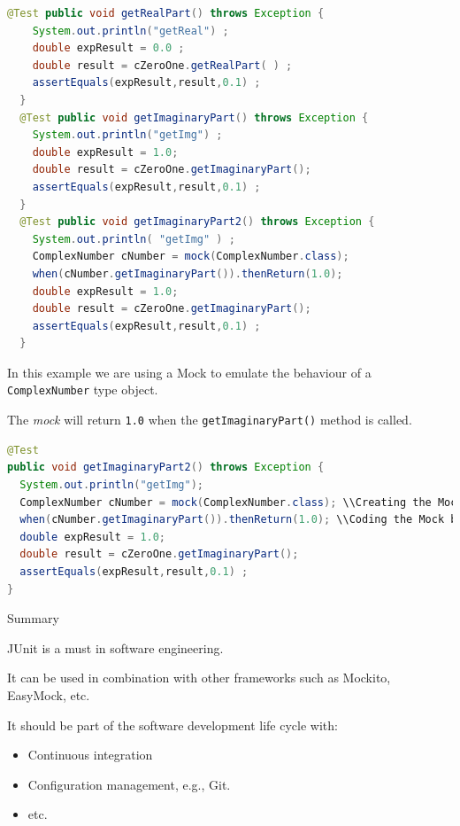 \documentclass[11pt, xcolor=svgnames]{beamer}
\begin{document}
\begin{frame}[fragile]

\begin{lstlisting}[language=JAVA,basicstyle=\scriptsize]
  @Test public void getRealPart() throws Exception {
    System.out.println("getReal") ;
    double expResult = 0.0 ;
    double result = cZeroOne.getRealPart( ) ;
    assertEquals(expResult,result,0.1) ;
  }
  @Test public void getImaginaryPart() throws Exception {
    System.out.println("getImg") ;
    double expResult = 1.0;
    double result = cZeroOne.getImaginaryPart();
    assertEquals(expResult,result,0.1) ;
  }
  @Test public void getImaginaryPart2() throws Exception {
    System.out.println( "getImg" ) ;
    ComplexNumber cNumber = mock(ComplexNumber.class);
    when(cNumber.getImaginaryPart()).thenReturn(1.0);
    double expResult = 1.0;
    double result = cZeroOne.getImaginaryPart();
    assertEquals(expResult,result,0.1) ;
  }
\end{lstlisting}

\end{frame}



\begin{frame}[fragile]

In this example we are using a Mock to emulate the behaviour of a \texttt{ComplexNumber} type object.

The \emph{mock} will return  \texttt{1.0} when the \texttt{getImaginaryPart()} method is called.

\begin{lstlisting}[language=JAVA,basicstyle=\scriptsize]
@Test
public void getImaginaryPart2() throws Exception {
  System.out.println("getImg");
  ComplexNumber cNumber = mock(ComplexNumber.class); \\Creating the Mock.
  when(cNumber.getImaginaryPart()).thenReturn(1.0); \\Coding the Mock behaviour.
  double expResult = 1.0;
  double result = cZeroOne.getImaginaryPart();
  assertEquals(expResult,result,0.1) ;
}
\end{lstlisting}

\end{frame}



\begin{frame}[fragile]{Summary}

JUnit is a must in software engineering. 

It can be used in combination with other frameworks such as Mockito, EasyMock, etc.

It should be part of the software development life cycle with:
\begin{itemize}
  \item Continuous integration
  \item Configuration management, e.g., Git.
  \item etc.
\end{itemize}

\end{frame}


\end{document}

